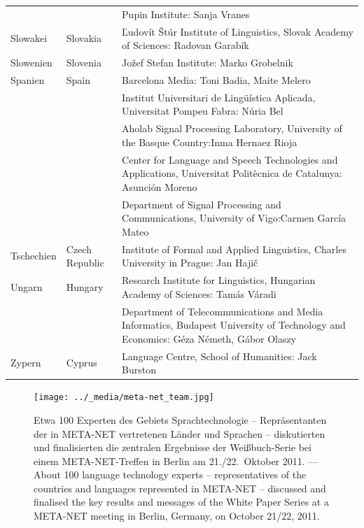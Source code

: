 \documentclass[]{../../metanetpaper}
\begin{document}
\begin{longtable}{@{}llp{113mm}@{}}
  & & Pupin Institute: Sanja Vranes \\ \addlinespace  
  Slowakei & \textcolor{grey1}{Slovakia} & Ľudovít Štúr Institute of Linguistics, Slovak Academy of Sciences: Radovan Garabík \\ \addlinespace 
  Slowenien & \textcolor{grey1}{Slovenia} & Jožef Stefan Institute: Marko Grobelnik \\ \addlinespace 
  Spanien & \textcolor{grey1}{Spain} & Barcelona Media: Toni Badia, Maite Melero \\ \addlinespace 
  & & Institut Universitari de Lingüística Aplicada, Universitat Pompeu Fabra: Núria Bel \\ \addlinespace 
  & & Aholab Signal Processing Laboratory, University of the Basque Country:\newline Inma Hernaez Rioja \\ \addlinespace 
  & & Center for Language and Speech Technologies and Applications, Universitat Politècnica de Catalunya:  Asunción Moreno \\ \addlinespace 
  & & Department of Signal Processing and Communications, University of Vigo:\newline Carmen García Mateo \\ \addlinespace 
  Tschechien & \textcolor{grey1}{Czech Republic} & Institute of Formal and Applied Linguistics, Charles University in Prague: Jan Hajič \\ \addlinespace
  Ungarn & \textcolor{grey1}{Hungary} & Research Institute for Linguistics, Hungarian Academy of Sciences: Tamás Váradi\\  \addlinespace
  & & Department of Telecommunications and Media Informatics, Budapest University of Technology and Economics: Géza Németh, Gábor Olaszy\\ \addlinespace
  Zypern & \textcolor{grey1}{Cyprus} & Language Centre, School of Humanities: Jack Burston
\end{longtable}
\normalsize

\renewcommand*{\figureformat}{}
\renewcommand*{\captionformat}{}

\begin{figure}[htbp]
  \center
  \texttt{[image: ../\_media/meta-net\_team.jpg]}
  \caption{Etwa 100 Experten des Gebiets Sprachtechnologie -- Repräsentanten der in META-NET vertretenen Länder und Sprachen -- diskutierten und finalisierten die zentralen Ergebnisse der Weißbuch-Serie bei einem META-NET-Treffen in Berlin am 21./22.~Oktober 2011. --- \textcolor{grey1}{About 100 language technology experts -- representatives of the countries and languages represented in META-NET -- discussed and finalised the key results and messages of the White Paper Series at a META-NET meeting in Berlin, Germany, on October 21/22, 2011.}}
  \medskip
\end{figure}
\end{document}
